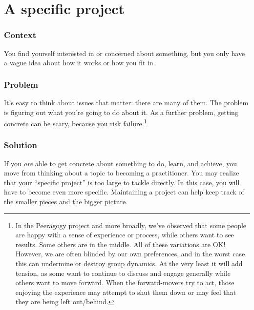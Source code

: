 \begingroup \color{BurntOrange}

\section{A specific project}\label{sec:A_specific_project}
\subsubsection*{Context}
You find yourself interested in or concerned about something, but you
only have a vague idea about how it works or how you fit in.

\subsubsection*{Problem}
It's easy to think about issues that matter: there are many of
them. The problem is figuring out what you're going to do about it.
As a further problem, getting concrete can be scary, because you risk
failure.\footnote{In the Peeragogy project and more broadly, we've
  observed that some people are happy with a sense of experience or
  process, while others want to see results. Some others are in the
  middle.  All of these variations are OK!  However, we are often
  blinded by our own preferences, and in the worst case this can
  undermine or destroy group dynamics.  At the very least it will add
  tension, as some want to continue to discuss and engage generally
  while others want to move forward.  When the forward-movers try to
  act, those enjoying the experience may attempt to shut them down or
  may feel that they are being left out/behind.}

\subsubsection*{Solution} 
If you \emph{are} able to get concrete about something to do, learn, and achieve, you move from thinking about a topic to becoming a practitioner.  You may realize that your ``specific project'' is too large to tackle directly. In this case, you will have to become even more specific.  Maintaining a project  can help keep track of the smaller pieces and the bigger picture.


